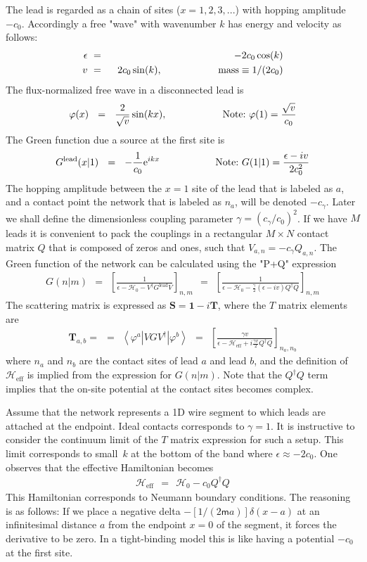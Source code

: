 \documentclass[onecolumn,fleqn, 11pt]{revtex4}
\newcommand{\eexp}{\mathrm{e}^}
\newcommand{\mass}{\mathsf{m}}
\newcommand{\beq}{\begin{eqnarray}}
\newcommand{\eeq}{\end{eqnarray}}
\begin{document}
The lead is regarded as a chain of sites ($x=1,2,3,...$)
with hopping amplitude $-c_0$. Accordingly a free "wave" 
with wavenumber $k$ has energy and velocity as follows:
\beq
\epsilon \ &=& \ -2c_0\cos(k) \\
v\ &=& \ \ 2c_0\sin(k), 
\hspace*{2cm} \text{mass} \equiv 1/(2c_0) 
\eeq
The flux-normalized free wave in a disconnected lead is 
\beq
\varphi(x) \ \ = \ \ \frac{2}{\sqrt{v}} \sin(kx),
\hspace*{2cm}
\mbox{Note:} \  \varphi(1)=\frac{\sqrt{v}}{c_0}
\eeq
The Green function due a source at the first site is 
\beq
G^{\text{lead}}(x|1) \ \ = \ \ -\frac{1}{c_0}\eexp{ikx} 
\hspace*{2cm}
\mbox{Note:} \ G(1|1)= \frac{\epsilon-iv}{2c_0^2}
\eeq
The hopping amplitude between the ${x=1}$ site of the lead 
that is labeled as $a$, and a contact point the network 
that is labeled as $n_a$, will be denoted $-c_{\gamma}$. 
Later we shall define the dimensionless coupling parameter ${\gamma=(c_{\gamma}/c_0)^2}$. 
If we have $M$ leads it is convenient to pack the couplings 
in a rectangular ${M\times N}$ contact matrix $Q$ that is composed 
of zeros and ones,  such that $V_{a,n}=-c_{\gamma} Q_{a,n}$.  
The Green function of the network can be calculated using the "P+Q" expression 
\beq
G(n|m) 
\ \ = \ \ \left[ \frac{1}{\epsilon-\mathcal{H}_0-V^{\dag}G^{\text{lead}}V} \right]_{n,m}
\ \ = \ \ \left[ \frac{1}{\epsilon-\mathcal{H}_0-\frac{\gamma}{2}(\epsilon-iv) Q^{\dag}Q} \right]_{n,m}
\eeq
The scattering matrix is expressed as $\bm{S}=\bm{1}-i\bm{T}$, 
where the $T$ matrix elements are 
\beq
\bm{T}_{a,b} =  
\ \ = \ \ \left\langle \varphi^{a} \left| VGV^{\dag} \right| \varphi^{b} \right\rangle 
\ \ = \ \ \left[\frac{\gamma v}{\epsilon-\mathcal{H}_{\text{eff}}+i\frac{\gamma v}{2} Q^{\dag}Q} \right]_{n_a,n_b}
\eeq
where $n_a$ and $n_b$ are the contact sites of lead $a$ and lead $b$, 
and the definition of $\mathcal{H}_{\text{eff}}$ is implied from the 
expression for $G(n|m)$. Note that the $Q^{\dag}Q$ term implies 
that the on-site potential at the contact sites becomes complex.  

Assume that the network represents a 1D wire segment to which leads 
are attached at the endpoint. Ideal contacts corresponds to $\gamma=1$. 
It is instructive to consider the continuum limit of the $T$ matrix 
expression for such a setup. This limit corresponds to small~$k$ 
at the bottom of the band where ${\epsilon\approx-2c_0}$. 
One observes that the effective Hamiltonian becomes 
\beq
\mathcal{H}_{\text{eff}} \ \ = \ \ \mathcal{H}_0 -c_0 Q^{\dag}Q
\eeq
This Hamiltonian corresponds to Neumann boundary conditions. 
The reasoning is as follows: If we place a negative 
delta $-[1/(2\mass a)]\delta(x-a)$ at an infinitesimal distance $a$ 
from the endpoint $x=0$ of the segment, 
it forces the derivative to be zero. In a tight-binding model 
this is like having a potential $-c_0$ at the first site.   
\end{document}
